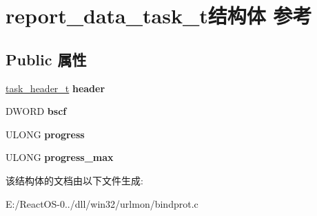 \hypertarget{structreport__data__task__t}{}\section{report\+\_\+data\+\_\+task\+\_\+t结构体 参考}
\label{structreport__data__task__t}
\subsection*{Public 属性}
\begin{DoxyCompactItemize}
\item 
\mbox{\label{structreport__data__task__t_a732ea9c796921fbf7c0f17ed5b6d3289}} 
\hyperlink{structtask__header__t}{task\+\_\+header\+\_\+t} {\bfseries header}
\item 
\mbox{\label{structreport__data__task__t_ac7fd1ef4923ede45752f8608fa0b8690}} 
D\+W\+O\+RD {\bfseries bscf}
\item 
\mbox{\label{structreport__data__task__t_a097dee7927d0505b6ac5a4ef92a189f0}} 
U\+L\+O\+NG {\bfseries progress}
\item 
\mbox{\label{structreport__data__task__t_ae8be5370320b0a663e535eb6708f534b}} 
U\+L\+O\+NG {\bfseries progress\+\_\+max}
\end{DoxyCompactItemize}


该结构体的文档由以下文件生成\+:\begin{DoxyCompactItemize}
\item 
E\+:/\+React\+O\+S-\/0../dll/win32/urlmon/bindprot.\+c\end{DoxyCompactItemize}
